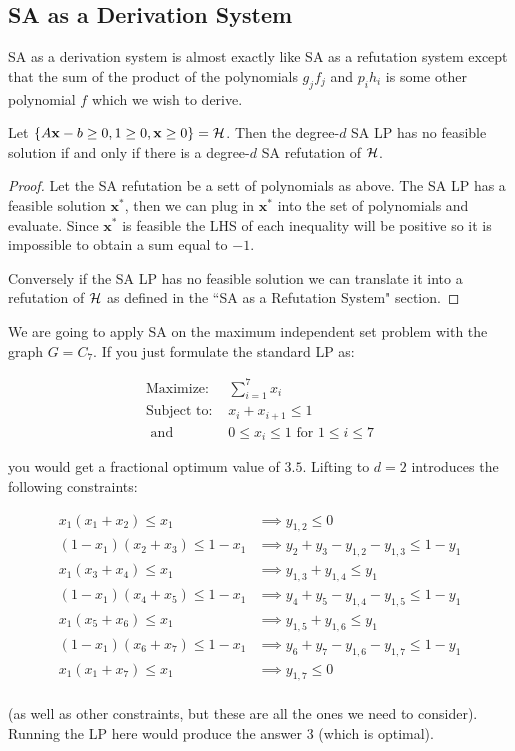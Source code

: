 \subsection{SA as a Derivation System}
SA as a derivation system is almost exactly like SA as a refutation system except that the sum of the product of the polynomials $g_jf_j$ and $p_ih_i$ is some other polynomial $f$ which we wish to derive.

\begin{lemma}
Let $\{A\mathbf{x} - b \geq 0, 1 \geq 0, \mathbf{x} \geq 0\} = \mathcal{H}$. Then the degree-$d$ SA LP has no feasible solution if and only if there is a degree-$d$ SA refutation of $\mathcal{H}$.
\end{lemma}
\begin{proof}
Let the SA refutation be a sett of polynomials as above. The SA LP has a feasible solution $\mathbf{x}^*$, then we can plug in $\mathbf{x}^*$ into the set of polynomials and evaluate. Since $\mathbf{x}^*$ is feasible the LHS of each inequality will be positive so it is impossible to obtain a sum equal to $-1$. 

Conversely if the SA LP has no feasible solution we can translate it into a refutation of $\mathcal{H}$ as defined in the ``SA as a Refutation System" section.
\end{proof} 

\begin{example}
We are going to apply SA on the maximum independent set problem with the graph $G = C_7$. If you just formulate the standard LP as:

\begin{align*}
\mbox{Maximize: } &\sum_{i=1}^{7} x_i\\
\mbox{Subject to: } &x_{i} + x_{i+1} \leq 1\\
\mbox{ and } &0 \leq x_i \leq 1  \mbox{ for } 1 \leq i \leq 7
\end{align*}

you would get a fractional optimum value of $3.5$. Lifting to $d = 2$ introduces the following constraints:

\begin{align*}
x_1(x_1 + x_2) \leq x_1 &\implies y_{1,2} \leq 0\\
(1-x_1)(x_2 + x_3) \leq 1 - x_1 &\implies y_{2} + y_{3} - y_{1,2} - y_{1,3} \leq 1 - y_{1}\\
x_1(x_3 + x_4) \leq x_1 &\implies y_{1,3} + y_{1,4} \leq y_{1}\\
(1-x_1)(x_4 + x_5) \leq 1 - x_1 &\implies y_{4} + y_{5} - y_{1,4} - y_{1,5} \leq 1 - y_{1}\\
x_1(x_5 + x_6) \leq x_1 &\implies y_{1,5} + y_{1,6} \leq y_{1}\\
(1-x_1)(x_6 + x_7) \leq 1 - x_1 &\implies y_{6} + y_{7} - y_{1,6} - y_{1,7} \leq 1 - y_{1}\\
x_1(x_1 + x_7) \leq x_1 &\implies y_{1,7} \leq 0\\
\end{align*}

(as well as other constraints, but these are all the ones we need to consider). Running the LP here would produce the answer $3$ (which is optimal).
\end{example}


